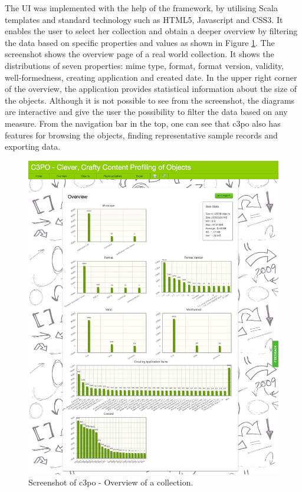 The UI was implemented with the help of the framework, by utilising Scala templates and standard technology such as HTML5, Javascript and CSS3. It enables the user to select her collection and obtain a deeper overview by filtering the data based on specific properties and values as shown in Figure \ref{fig:web_app_overview}. The screenshot shows the overview page of a real world collection. It shows the distributions of seven properties: mime type, format, format version, validity, well-formedness, creating application and created date. In the upper right corner of the overview, the application provides statistical information about the size of the objects. Although it is not possible to see from the screenshot, the diagrams are interactive and give the user the possibility to filter the data based on any measure. From the navigation bar in the top, one can see that c3po also has features for browsing the objects, finding representative sample records and exporting data.

\begin{figure}[tbp]
\begin{center}
\includegraphics[width=5.5in]{figures/architecture/web_app_overview}
\caption{Screenshot of c3po - Overview of a collection.}
\label{fig:web_app_overview}
\end{center}
\end{figure}

